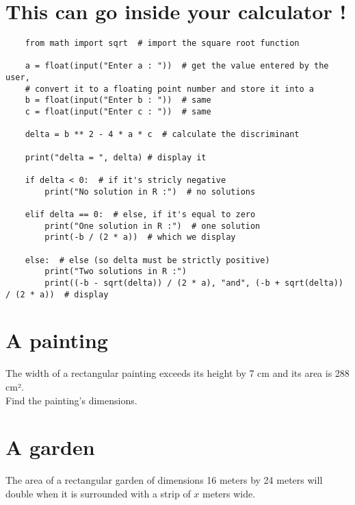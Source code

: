 \documentclass[12pt,a4paper,article,english,firamath]{nsi}
\begin{document}
\maketitle

\section*{This can go inside your calculator !}
\begin{pyc}
    \begin{verbatim}
    from math import sqrt  # import the square root function

    a = float(input("Enter a : "))  # get the value entered by the user,
    # convert it to a floating point number and store it into a
    b = float(input("Enter b : "))  # same
    c = float(input("Enter c : "))  # same

    delta = b ** 2 - 4 * a * c  # calculate the discriminant
    
    print("delta = ", delta) # display it

    if delta < 0:  # if it's stricly negative
        print("No solution in R :")  # no solutions

    elif delta == 0:  # else, if it's equal to zero
        print("One solution in R :")  # one solution
        print(-b / (2 * a))  # which we display

    else:  # else (so delta must be strictly positive)
        print("Two solutions in R :")
        print((-b - sqrt(delta)) / (2 * a), "and", (-b + sqrt(delta)) / (2 * a))  # display
    \end{verbatim}
\end{pyc}
\section*{A painting}
The width of a rectangular painting exceeds its height by 7 cm and its area is 288 cm².\\
Find the painting's dimensions.

\section*{A garden}
The area of a rectangular garden of dimensions 16 meters by 24 meters will double when it is surrounded with a strip of $x$ meters wide.\\
\end{document}
